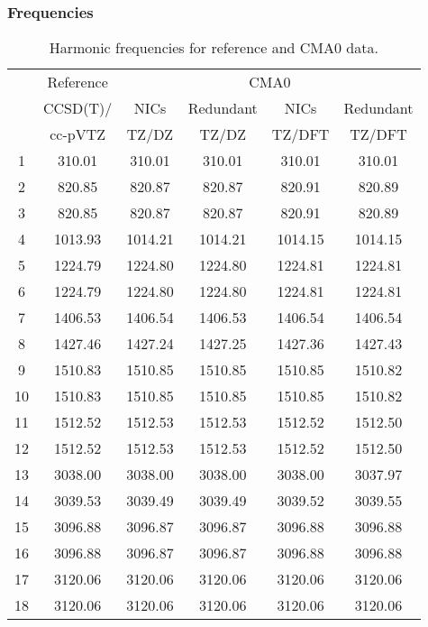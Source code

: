 \documentclass[10pt,oneside]{article}
\begin{document}
\begin{table}[h!]
\subsubsection*{Frequencies}
\centering
\caption{Harmonic frequencies for reference and CMA0 data.}
\begin{tabular}{cccccc}
\toprule
{} & Reference & \multicolumn{4}{c}{CMA0} \\
{} &  CCSD(T)/ &    NICs &  Redundant &    NICs & Redundant \\
{} &   cc-pVTZ &   TZ/DZ &      TZ/DZ &  TZ/DFT &    TZ/DFT \\
\midrule
1  &    310.01 &  310.01 &     310.01 &  310.01 &    310.01 \\
2  &    820.85 &  820.87 &     820.87 &  820.91 &    820.89 \\
3  &    820.85 &  820.87 &     820.87 &  820.91 &    820.89 \\
4  &   1013.93 & 1014.21 &    1014.21 & 1014.15 &   1014.15 \\
5  &   1224.79 & 1224.80 &    1224.80 & 1224.81 &   1224.81 \\
6  &   1224.79 & 1224.80 &    1224.80 & 1224.81 &   1224.81 \\
7  &   1406.53 & 1406.54 &    1406.53 & 1406.54 &   1406.54 \\
8  &   1427.46 & 1427.24 &    1427.25 & 1427.36 &   1427.43 \\
9  &   1510.83 & 1510.85 &    1510.85 & 1510.85 &   1510.82 \\
10 &   1510.83 & 1510.85 &    1510.85 & 1510.85 &   1510.82 \\
11 &   1512.52 & 1512.53 &    1512.53 & 1512.52 &   1512.50 \\
12 &   1512.52 & 1512.53 &    1512.53 & 1512.52 &   1512.50 \\
13 &   3038.00 & 3038.00 &    3038.00 & 3038.00 &   3037.97 \\
14 &   3039.53 & 3039.49 &    3039.49 & 3039.52 &   3039.55 \\
15 &   3096.88 & 3096.87 &    3096.87 & 3096.88 &   3096.88 \\
16 &   3096.88 & 3096.87 &    3096.87 & 3096.88 &   3096.88 \\
17 &   3120.06 & 3120.06 &    3120.06 & 3120.06 &   3120.06 \\
18 &   3120.06 & 3120.06 &    3120.06 & 3120.06 &   3120.06 \\
\bottomrule
\end{tabular}
\end{table}
\end{document}

